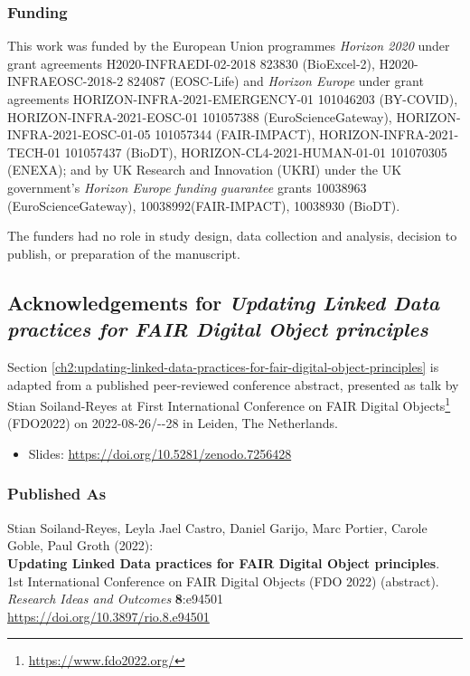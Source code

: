 \subsubsection*{Funding}

This work was funded by the European Union programmes \emph{Horizon 2020} under grant agreements H2020-INFRAEDI-02-2018 823830 (BioExcel-2), H2020-INFRAEOSC-2018-2 824087 (EOSC-Life) and \emph{Horizon Europe} under grant agreements HORIZON-INFRA-2021-EMERGENCY-01 101046203 (BY-COVID), HORIZON-INFRA-2021-EOSC-01 101057388 (EuroScienceGateway), HORIZON-INFRA-2021-EOSC-01-05 101057344 (FAIR-IMPACT), HORIZON-INFRA-2021-TECH-01 101057437 (BioDT), HORIZON-CL4-2021-HUMAN-01-01 101070305 (ENEXA); and by UK Research and Innovation (UKRI) under the UK government’s \emph{Horizon Europe funding guarantee} grants 10038963 (EuroScienceGateway), 10038992(FAIR-IMPACT), 10038930 (BioDT).

The funders had no role in study design, data collection and analysis, decision to publish, or preparation of the manuscript.


\subsection{Acknowledgements for \textit{Updating Linked Data practices for FAIR Digital Object principles}}\label{ch11:updating-ld}


Section \ref{ch2:updating-linked-data-practices-for-fair-digital-object-principles} is adapted from a published peer-reviewed conference abstract,
presented as talk by Stian Soiland-Reyes at 
First International Conference on FAIR Digital Objects\footnote{\url{https://www.fdo2022.org/}} 
(FDO2022) on
2022-08-26/-{}-28 in Leiden, The Netherlands. 


\begin{itemize}
    \item Slides: \url{https://doi.org/10.5281/zenodo.7256428}
\end{itemize}

\subsubsection*{Published As}

Stian Soiland-Reyes, Leyla Jael Castro, Daniel Garijo, Marc Portier, Carole Goble, Paul Groth (2022):\\
\textbf{Updating Linked Data practices for FAIR Digital Object principles}.\\
1st International Conference on FAIR Digital Objects (FDO 2022) (abstract).\\
\textit{Research Ideas and Outcomes} \textbf{8}:e94501\\
\url{https://doi.org/10.3897/rio.8.e94501}


